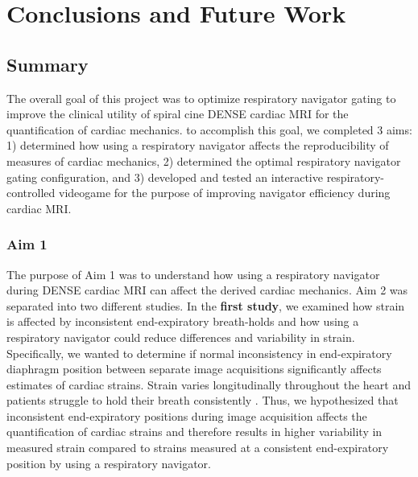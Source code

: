 \chapter{Conclusions and Future Work}

\section{Summary}
	The overall goal of this project was to optimize respiratory navigator gating to improve the clinical utility of spiral cine DENSE cardiac MRI for the quantification of cardiac mechanics. to accomplish this goal, we completed 3 aims: 1) determined how using a respiratory navigator affects the reproducibility of measures of cardiac mechanics, 2) determined the optimal respiratory navigator gating configuration, and 3) developed and tested an interactive respiratory-controlled videogame for the purpose of improving navigator efficiency during cardiac MRI.

\subsection{Aim 1}
	The purpose of Aim 1 was to understand how using a respiratory navigator during DENSE cardiac MRI can affect the derived cardiac mechanics. Aim 2 was separated into two different studies. In the \textbf{first study}, we examined how strain is affected by inconsistent end-expiratory breath-holds and how using a respiratory navigator could reduce differences and variability in strain. Specifically, we wanted to determine if normal inconsistency in end-expiratory diaphragm position between separate image acquisitions significantly affects estimates of cardiac strains. Strain varies longitudinally throughout the heart \cite{Kuijer2002,Moore2000,Young1994a,Feng2009,NasiraeiMoghaddam2010,Donekal2013a,Suever2017} and patients struggle to hold their breath consistently \cite{Liu1993,Wang1995a,Taylor1997a,Holland1998c,Fischer2006a}. Thus, we hypothesized that inconsistent end-expiratory positions during image acquisition affects the quantification of cardiac strains and therefore results in higher variability in measured strain compared to strains measured at a consistent end-expiratory position by using a respiratory navigator.

